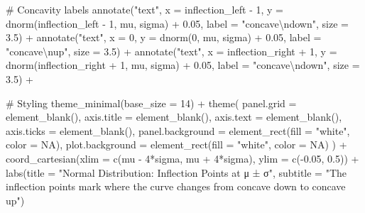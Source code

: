 \documentclass[
  letterpaper,
  DIV=11,
  numbers=noendperiod]{scrreprt}
\newenvironment{Shaded}{\begin{snugshade}}{\end{snugshade}}
\newcommand{\AttributeTok}[1]{\textcolor[rgb]{0.40,0.45,0.13}{#1}}
\newcommand{\CommentTok}[1]{\textcolor[rgb]{0.37,0.37,0.37}{#1}}
\newcommand{\ConstantTok}[1]{\textcolor[rgb]{0.56,0.35,0.01}{#1}}
\newcommand{\DecValTok}[1]{\textcolor[rgb]{0.68,0.00,0.00}{#1}}
\newcommand{\FloatTok}[1]{\textcolor[rgb]{0.68,0.00,0.00}{#1}}
\newcommand{\FunctionTok}[1]{\textcolor[rgb]{0.28,0.35,0.67}{#1}}
\newcommand{\NormalTok}[1]{\textcolor[rgb]{0.00,0.23,0.31}{#1}}
\newcommand{\SpecialCharTok}[1]{\textcolor[rgb]{0.37,0.37,0.37}{#1}}
\newcommand{\StringTok}[1]{\textcolor[rgb]{0.13,0.47,0.30}{#1}}
\begin{document}
\begin{Shaded}
\begin{Highlighting}[]
  \CommentTok{\# Concavity labels}
  \FunctionTok{annotate}\NormalTok{(}\StringTok{"text"}\NormalTok{, }\AttributeTok{x =}\NormalTok{ inflection\_left }\SpecialCharTok{{-}} \DecValTok{1}\NormalTok{, }\AttributeTok{y =} \FunctionTok{dnorm}\NormalTok{(inflection\_left }\SpecialCharTok{{-}} \DecValTok{1}\NormalTok{, mu, sigma) }\SpecialCharTok{+} \FloatTok{0.05}\NormalTok{,}
           \AttributeTok{label =} \StringTok{"concave}\SpecialCharTok{\textbackslash{}n}\StringTok{down"}\NormalTok{, }\AttributeTok{size =} \FloatTok{3.5}\NormalTok{) }\SpecialCharTok{+}
  \FunctionTok{annotate}\NormalTok{(}\StringTok{"text"}\NormalTok{, }\AttributeTok{x =} \DecValTok{0}\NormalTok{, }\AttributeTok{y =} \FunctionTok{dnorm}\NormalTok{(}\DecValTok{0}\NormalTok{, mu, sigma) }\SpecialCharTok{+} \FloatTok{0.05}\NormalTok{,}
           \AttributeTok{label =} \StringTok{"concave}\SpecialCharTok{\textbackslash{}n}\StringTok{up"}\NormalTok{, }\AttributeTok{size =} \FloatTok{3.5}\NormalTok{) }\SpecialCharTok{+}
  \FunctionTok{annotate}\NormalTok{(}\StringTok{"text"}\NormalTok{, }\AttributeTok{x =}\NormalTok{ inflection\_right }\SpecialCharTok{+} \DecValTok{1}\NormalTok{, }\AttributeTok{y =} \FunctionTok{dnorm}\NormalTok{(inflection\_right }\SpecialCharTok{+} \DecValTok{1}\NormalTok{, mu, sigma) }\SpecialCharTok{+} \FloatTok{0.05}\NormalTok{,}
           \AttributeTok{label =} \StringTok{"concave}\SpecialCharTok{\textbackslash{}n}\StringTok{down"}\NormalTok{, }\AttributeTok{size =} \FloatTok{3.5}\NormalTok{) }\SpecialCharTok{+}
  
  \CommentTok{\# Styling}
  \FunctionTok{theme\_minimal}\NormalTok{(}\AttributeTok{base\_size =} \DecValTok{14}\NormalTok{) }\SpecialCharTok{+}
  \FunctionTok{theme}\NormalTok{(}
    \AttributeTok{panel.grid =} \FunctionTok{element\_blank}\NormalTok{(),}
    \AttributeTok{axis.title =} \FunctionTok{element\_blank}\NormalTok{(),}
    \AttributeTok{axis.text =} \FunctionTok{element\_blank}\NormalTok{(),}
    \AttributeTok{axis.ticks =} \FunctionTok{element\_blank}\NormalTok{(),}
    \AttributeTok{panel.background =} \FunctionTok{element\_rect}\NormalTok{(}\AttributeTok{fill =} \StringTok{"white"}\NormalTok{, }\AttributeTok{color =} \ConstantTok{NA}\NormalTok{),}
    \AttributeTok{plot.background =} \FunctionTok{element\_rect}\NormalTok{(}\AttributeTok{fill =} \StringTok{"white"}\NormalTok{, }\AttributeTok{color =} \ConstantTok{NA}\NormalTok{)}
\NormalTok{  ) }\SpecialCharTok{+}
  \FunctionTok{coord\_cartesian}\NormalTok{(}\AttributeTok{xlim =} \FunctionTok{c}\NormalTok{(mu }\SpecialCharTok{{-}} \DecValTok{4}\SpecialCharTok{*}\NormalTok{sigma, mu }\SpecialCharTok{+} \DecValTok{4}\SpecialCharTok{*}\NormalTok{sigma), }\AttributeTok{ylim =} \FunctionTok{c}\NormalTok{(}\SpecialCharTok{{-}}\FloatTok{0.05}\NormalTok{, }\FloatTok{0.5}\NormalTok{)) }\SpecialCharTok{+}
  \FunctionTok{labs}\NormalTok{(}\AttributeTok{title =} \StringTok{"Normal Distribution: Inflection Points at μ ± σ"}\NormalTok{,}
       \AttributeTok{subtitle =} \StringTok{"The inflection points mark where the curve changes from concave down to concave up"}\NormalTok{)}
\end{Highlighting}
\end{Shaded}
\end{document}

